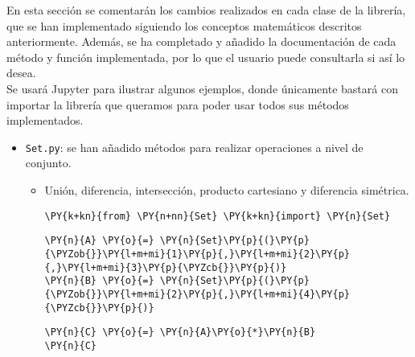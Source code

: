 

En esta sección se comentarán los cambios realizados en cada
clase de la librería, que se han implementado siguiendo los conceptos matemáticos descritos anteriormente. Además, se ha completado y añadido la documentación de cada método y función implementada, por lo que el usuario puede consultarla si así lo desea. \\
Se usará Jupyter para ilustrar algunos ejemplos, donde únicamente bastará con importar la librería que queramos para poder usar todos sus métodos implementados.

\begin{itemize}

\item \texttt{Set.py}: se han añadido métodos para realizar operaciones
  a nivel de conjunto.

  \begin{itemize}
  \item Unión, diferencia, intersección, producto cartesiano y diferencia
    simétrica.


    \begin{tcolorbox}[breakable, size=fbox, boxrule=1pt, pad at break*=1mm,colback=cellbackground, colframe=cellborder]
\begin{Verbatim}[commandchars=\\\{\}]
\PY{k+kn}{from} \PY{n+nn}{Set} \PY{k+kn}{import} \PY{n}{Set}
\end{Verbatim}
\end{tcolorbox}

    
    \begin{tcolorbox}[breakable, size=fbox, boxrule=1pt, pad at break*=1mm,colback=cellbackground, colframe=cellborder]
\begin{Verbatim}[commandchars=\\\{\}]
\PY{n}{A} \PY{o}{=} \PY{n}{Set}\PY{p}{(}\PY{p}{\PYZob{}}\PY{l+m+mi}{1}\PY{p}{,}\PY{l+m+mi}{2}\PY{p}{,}\PY{l+m+mi}{3}\PY{p}{\PYZcb{}}\PY{p}{)}
\PY{n}{B} \PY{o}{=} \PY{n}{Set}\PY{p}{(}\PY{p}{\PYZob{}}\PY{l+m+mi}{2}\PY{p}{,}\PY{l+m+mi}{4}\PY{p}{\PYZcb{}}\PY{p}{)}
\end{Verbatim}
\end{tcolorbox}


    \begin{tcolorbox}[breakable, size=fbox, boxrule=1pt, pad at break*=1mm,colback=cellbackground, colframe=cellborder]
\begin{Verbatim}[commandchars=\\\{\}]
\PY{n}{C} \PY{o}{=} \PY{n}{A}\PY{o}{*}\PY{n}{B}
\PY{n}{C}
\end{Verbatim}
\end{tcolorbox}



\end{itemize}
\end{itemize}
